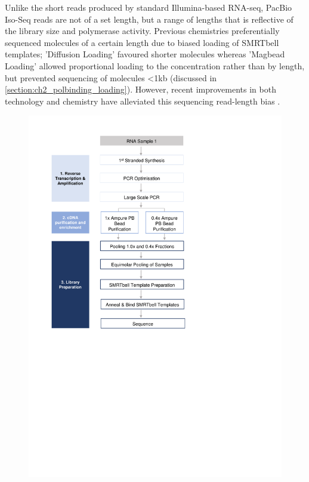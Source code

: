 Unlike the short reads produced by standard Illumina-based RNA-seq, PacBio Iso-Seq reads are not of a set length, but a range of lengths that is reflective of the library size and polymerase activity\cite{Ardui2018,Rhoads2015}. Previous chemistries preferentially sequenced molecules of a certain length due to biased loading of SMRTbell templates; 'Diffusion Loading' favoured shorter molecules\cite{Loomis2013} whereas 'Magbead Loading' allowed proportional loading to the concentration rather than by length, but prevented sequencing of molecules <1kb (discussed in \cref{section:ch2_polbinding_loading}). However, recent improvements in both technology and chemistry have alleviated this sequencing read-length bias \cite{Oikonomopoulos2020}.

\begin{figure}[!h]
	\centering
	\includegraphics[page=14,trim={0 5cm 0 0 },clip, scale = 0.7]{Figures/ProjectDevelopment_Figures.pdf}

\end{figure}
